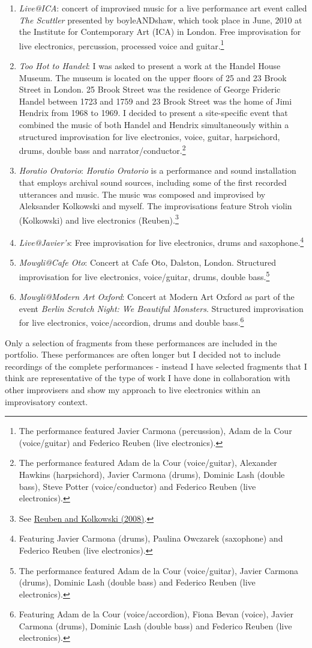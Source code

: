 \begin{enumerate} 
\item \emph{Live@ICA}: concert of improvised music for a live performance art event called \emph{The Scuttler} presented by boyleANDshaw, which took place in June, 2010 at the Institute for Contemporary Art (ICA) in London. Free improvisation for live electronics, percussion, processed voice and guitar.\footnote{The performance featured Javier Carmona (percussion), Adam de la Cour (voice/guitar) and Federico Reuben (live electronics).}
\item \emph{Too Hot to Handel}: I was asked to present a work at the Handel House Museum. The museum is located on the upper floors of 25 and 23 Brook Street in London. 25 Brook Street was the residence of George Frideric Handel between 1723 and 1759 and 23 Brook Street was the home of Jimi Hendrix from 1968 to 1969. I decided to present a site-specific event that combined the music of both Handel and Hendrix simultaneously within a structured improvisation for live electronics, voice, guitar, harpsichord, drums, double bass and narrator/conductor.\footnote{The performance featured Adam de la Cour (voice/guitar), Alexander Hawkins (harpsichord), Javier Carmona (drums), Dominic Lash (double bass), Steve Potter (voice/conductor) and Federico Reuben (live electronics).}
\item \emph{Horatio Oratorio}: \emph{Horatio Oratorio} is a performance and sound installation that employs archival sound sources, including some of the first recorded utterances and music. The music was composed and improvised by Aleksander Kolkowski and myself. The improvisations feature Stroh violin (Kolkowski) and live electronics (Reuben).\footnote{See \hyperlink{reuben}{Reuben and Kolkowski (2008)}.}
\item \emph{Live@Javier's}: Free improvisation for live electronics, drums and saxophone.\footnote{Featuring Javier Carmona (drums), Paulina Owczarek (saxophone) and Federico Reuben (live electronics).}
\item \emph{Mowgli@Cafe Oto}: Concert at Cafe Oto, Dalston, London. Structured improvisation for live electronics, voice/guitar, drums, double bass.\footnote{The performance featured Adam de la Cour (voice/guitar), Javier Carmona (drums), Dominic Lash (double bass) and Federico Reuben (live electronics).}
\item \emph{Mowgli@Modern Art Oxford}: Concert at Modern Art Oxford as part of the event \emph{Berlin Scratch Night: We Beautiful Monsters}. Structured improvisation for live electronics, voice/accordion, drums and double bass.\footnote{Featuring Adam de la Cour (voice/accordion), Fiona Bevan (voice), Javier Carmona (drums), Dominic Lash (double bass) and Federico Reuben (live electronics).}
\end{enumerate}
Only a selection of fragments from these performances are included in the portfolio. These performances are often longer but I decided not to include recordings of the complete performances - instead I have selected fragments that I think are representative of the type of work I have done in collaboration with other improvisers and show my approach to live electronics within an improvisatory context.

\label{ch:compositions}